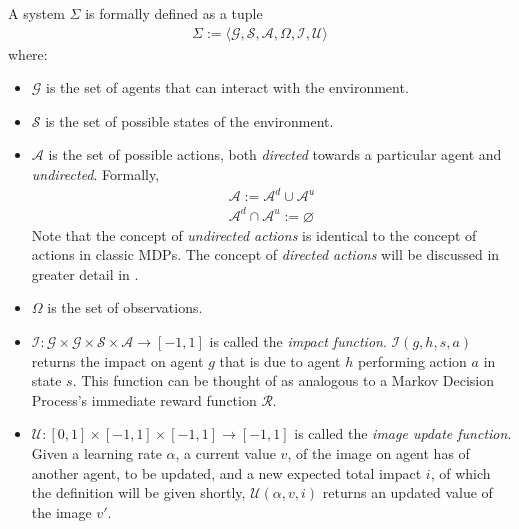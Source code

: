 \begin{definition}[System]
\label{def:systempo}
A system $\Sigma$ is formally defined as a tuple
\begin{align*}
    \Sigma := \big \langle \mathcal{G}, \mathcal{S}, \mathcal{A}, \Omega, \mathcal{I}, \mathcal{U} \big \rangle
  \end{align*}
where:
\begin{itemize}
    \item $\mathcal{G}$ is the set of agents that can interact with the environment.
    \item $\mathcal{S}$ is the set of possible states of the environment.
    \item $\mathcal{A}$ is the set of possible actions, both \textit{directed} towards a particular agent and \textit{undirected}. Formally,
    \begin{align*}
    \mathcal{A} := \mathcal{A}^d \cup \mathcal{A}^u\\
    \mathcal{A}^d \cap \mathcal{A}^u := \varnothing
  \end{align*}
  Note that the concept of \textit{undirected actions} is identical to the concept of actions in classic MDPs. The concept of \textit{directed actions} will be discussed in greater detail in .
  
  \item $\Omega$ is the set of observations.
  \item $\mathcal{I}: \mathcal{G} \times \mathcal{G} \times \mathcal{S} \times \mathcal{A} \rightarrow [-1,1]$ is called the \textit{impact function}. $\mathcal{I}(g,h,s,a)$ returns the impact on agent $g$ that is due to agent $h$ performing action $a$ in state $s$. This function can be thought of as analogous to a Markov Decision Process's immediate reward function $\mathcal{R}$.
  \item $\mathcal{U} : [0,1] \times [-1,1] \times [-1,1] \rightarrow [-1,1]$ is called the \textit{image update function}. Given a learning rate $\alpha$, a current value $v$, of the image on agent has of another agent, to be updated, and a new expected total impact $i$, of which the definition will be given shortly, $\mathcal{U}(\alpha, v, i)$ returns an updated value of the image $v'$.
\end{itemize}
\end{definition}


